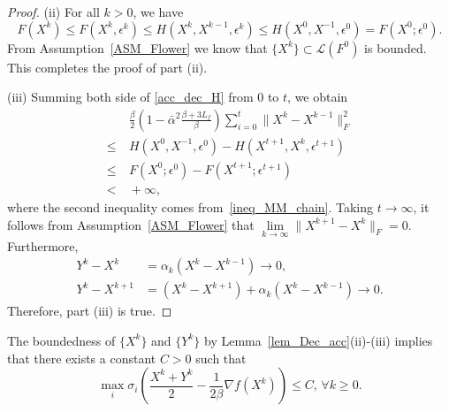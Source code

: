 \documentclass[twoside,11pt]{article}
\numberwithin{equation}{section}
\begin{document}
\begin{proof}
  
  (ii)  For all $k>0 $, we have 
    \begin{equation} \label{ineq_MM_chain}
      F (X^{k}) \le F (X^{k},\epsilon^{k}) \le H (X^{k},X^{k-1},\epsilon^{k}) \le H(X^{0},X^{-1},\epsilon^{0}) = F (X^{0};\epsilon^{0}). 
    \end{equation}
   From Assumption~\ref{ASM_Flower} we know that $\{X^{k}\}\subset\mathcal{L} (F^{0}) $ is bounded. This completes the proof of part  (ii). 
  
  
  (iii)  Summing both side of \eqref{acc_dec_H} from $0 $ to $t$, we obtain
    \begin{equation}
      \begin{aligned}
        &\ \frac{\beta}{2} \left(1-\bar{\alpha}^{2}\frac{\beta+3L_{f}}{\beta}\right)\sum\limits_{i=0}^{t} \|X^k-X^{k-1}\|_{F}^{2} \\
      \le&\ H(X^{0},X^{-1},\epsilon^{0}) - H (X^{t+1},X^{k},\epsilon^{t+1}) \\
      \le&\ F (X^{0};\epsilon^{0}) -   F(X^{t+1};\epsilon^{t+1}) \\
      <&\ +\infty,
      \end{aligned}
    \end{equation}
    where the second inequality comes from~\eqref{ineq_MM_chain}. 
    Taking $t\to\infty$, it follows from  Assumption~\ref{ASM_Flower} that 
  $\lim\limits_{k\to\infty}\|X^{k+1}-X^{k}\|_{F}=0 $. Furthermore,  
    \begin{equation}
      \begin{aligned}
        Y^{k}-X^{k} &= \alpha_{k} (X^{k}-X^{k-1}) \to 0, \\
        Y^{k}-X^{k+1} &=  (X^{k}-X^{k+1})+\alpha_{k} (X^{k}-X^{k-1}) \to 0.
      \end{aligned}
    \end{equation}
    Therefore, part  (iii) is true. 
 \end{proof}


The boundedness of $\{X^{k}\} $ and $\{Y^k\} $ by    Lemma~\ref{lem_Dec_acc}(ii)-(iii) 
implies that there exists a constant  $C > 0 $ such that 
$$
\max\limits_{i}\sigma_{i} \left(\frac{X^{k}+Y^k}{2} -\frac{1}{2\beta}\nabla f (X^{k})\right)\le C  ,\, \forall k\ge 0. 
$$
\end{document}
